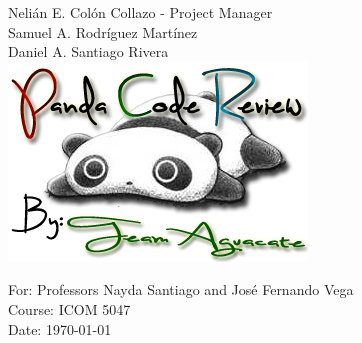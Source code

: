 \begin{titlepage}
\begin{center}
Nelián E. Colón Collazo - Project Manager \\
Samuel A. Rodríguez Martínez \\
Daniel A. Santiago Rivera \\[1cm]

\includegraphics[scale=1.25]{img/pandaLogoTeamAguacate}\\[1cm]

\vfill

For: Professors Nayda Santiago and José Fernando Vega \\
Course: ICOM 5047 \\
Date: \today






\end{center}

\end{titlepage}
